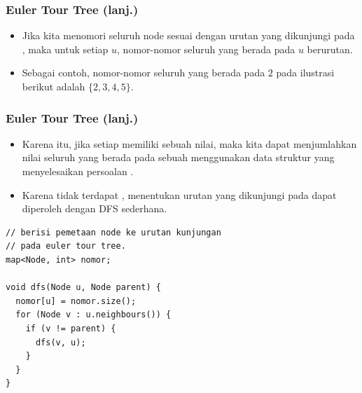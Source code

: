 \begin{frame}
\frametitle{Euler Tour Tree (lanj.)}
\begin{itemize}
  \item Jika kita menomori seluruh node sesuai dengan urutan \fnode yang dikunjungi pada \feulerTourTree, maka untuk setiap \fnode $u$, nomor-nomor seluruh \fnode yang berada pada \fsubtree \fnode $u$ berurutan.
  \item Sebagai contoh, nomor-nomor seluruh \fnode yang berada pada \fsubtree \fnode $2$ pada ilustrasi berikut adalah $\{2, 3, 4, 5\}$.
\end{itemize}
\begin{figure}[!h]
\centering
\end{figure}
\end{frame}

\begin{frame}[fragile]
\frametitle{Euler Tour Tree (lanj.)}
\begin{itemize}
  \item Karena itu, jika setiap \fnode memiliki sebuah nilai, maka kita dapat menjumlahkan nilai seluruh \fnode yang berada pada \fsubtree sebuah \fnode menggunakan data struktur yang menyelesaikan persoalan \frangeSumQuery.
  \item Karena tidak terdapat \fcycle, menentukan urutan \fnode yang dikunjungi pada \feulerTourTree dapat diperoleh dengan DFS sederhana.
\end{itemize}
\begin{lstlisting}
// berisi pemetaan node ke urutan kunjungan
// pada euler tour tree.
map<Node, int> nomor;

void dfs(Node u, Node parent) {
  nomor[u] = nomor.size();
  for (Node v : u.neighbours()) {
    if (v != parent) {
      dfs(v, u);
    }
  }
}
\end{lstlisting}
\end{frame}

